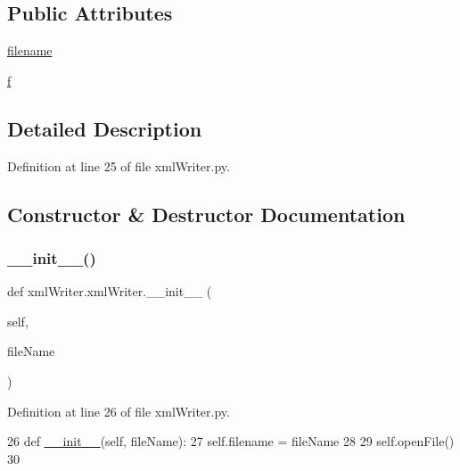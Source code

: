 \subsection*{Public Attributes}
\begin{DoxyCompactItemize}
\item 
\mbox{\hyperlink{classxml_writer_1_1xml_writer_a4842af70f50831bd8981fc2be0a9fe01}{filename}}
\item 
\mbox{\hyperlink{classxml_writer_1_1xml_writer_a1ecd576801e94caa6dcc033ceb534111}{f}}
\end{DoxyCompactItemize}


\subsection{Detailed Description}


Definition at line 25 of file xml\+Writer.\+py.



\subsection{Constructor \& Destructor Documentation}
\mbox{\label{classxml_writer_1_1xml_writer_a0b43f6115153b244e10d1933ee33500a}} 
\subsubsection{\texorpdfstring{\+\_\+\+\_\+init\+\_\+\+\_\+()}{\_\_init\_\_()}}
{\footnotesize\ttfamily def xml\+Writer.\+xml\+Writer.\+\_\+\+\_\+init\+\_\+\+\_\+ (\begin{DoxyParamCaption}\item[{}]{self,  }\item[{}]{file\+Name }\end{DoxyParamCaption})}



Definition at line 26 of file xml\+Writer.\+py.


\begin{DoxyCode}
26     \textcolor{keyword}{def }\mbox{\hyperlink{classxml_writer_1_1xml_writer_a0b43f6115153b244e10d1933ee33500a}{\_\_init\_\_}}(self, fileName):
27         self.filename = fileName
28         
29         self.openFile()
30         
\end{DoxyCode}


